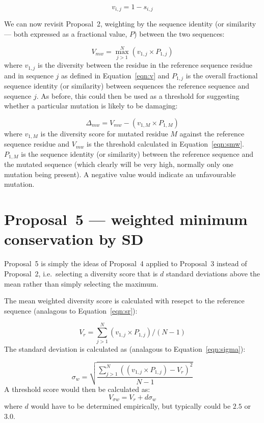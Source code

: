 \documentclass[a4paper]{article}
\begin{document}
\begin{equation}\label{eqn:v}
  v_{i,j} = 1 - s_{i,j}
\end{equation}

We can now revisit Proposal~2, weighting by the sequence identity (or
similarity --- both expressed as a fractional value, $P$) between the
two sequences:

\begin{equation} \label{eqn:smw}
  V_{mw} = \max_{j>1}^N(v_{1, j} \times P_{1,j})
\end{equation}
where $v_{1,j}$ is the diversity between the residue in the reference
sequence residue and in sequence $j$ as defined in
Equation~\ref{eqn:v} and $P_{1,j}$ is the overall fractional sequence
identity (or similarity) between sequences the reference sequence and
sequence $j$.  As before, this could then be used as a threshold for
suggesting whether a particular mutation is likely to be damaging:

\begin{equation}
  \Delta_{mw} = V_{mw} - (v_{1, M} \times P_{1, M}) 
\end{equation}
where $v_{1,M}$ is the diversity score for mutated residue $M$ against
the reference sequence residue and $V_{mw}$ is the threshold
calculated in Equation~\ref{eqn:smw}. $P_{1,M}$ is the sequence
identity (or similarity) between the reference sequence and the
mutated sequence (which clearly will be very high, normally only one
mutation being present). A negative value would indicate an
unfavourable mutation.

\section{Proposal~5 --- weighted minimum conservation by SD}
Proposal~5 is simply the ideas of Proposal~4 applied to Proposal~3
instead of Proposal~2, i.e.\ selecting a diversity score that is $d$ standard
deviations above the mean rather than simply selecting the
maximum.

The mean weighted diversity score is calculated with resepct to the
reference sequence (analagous to Equation~\ref{eqn:sr}):

\begin{equation}\label{eqn:vr}
  V_{r} = \sum_{j>1}^N(v_{1, j} \times P_{1,j}) / (N-1)
\end{equation}
The standard deviation is calculated as (analagous to Equation~\ref{eqn:sigma}):

\begin{equation}
  \sigma_w = \sqrt{\frac{\sum_{j>1}^N((v_{1,j} \times P_{1,j}) - V_r)^2}{N-1}}
\end{equation}
A threshold score would then be calculated as:
\begin{equation}\label{eqn:ssigmaw}
  V_{\sigma w} = V_r + d\sigma_w
\end{equation}
where $d$ would have to be determined empirically, but typically could
be $2.5$ or $3.0$.
\end{document}
